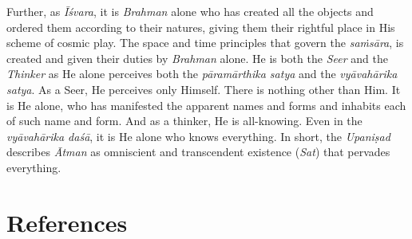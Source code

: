 Further, as \emph{Īśvara}, it is \emph{Brahman} alone who has created all the objects and ordered them according to their natures, giving them their rightful place in His scheme of cosmic play. The space and time principles that govern the \emph{saṁsāra}, is created and given their duties by \emph{Brahman} alone. He is both the \emph{Seer} and the \emph{Thinker} as He alone perceives both the \emph{pāramārthika satya} and the \emph{vyāvahārika satya}. As a Seer, He perceives only Himself. There is nothing other than Him. It is He alone, who has manifested the apparent names and forms and inhabits each of such name and form. And as a thinker, He is all-knowing. Even in the \emph{vyāvahārika daśā}, it is He alone who knows everything. In short, the \emph{Upaniṣad} describes \emph{Ātman} as omniscient and transcendent existence (\emph{Sat}) that pervades everything.

\section*{References}

